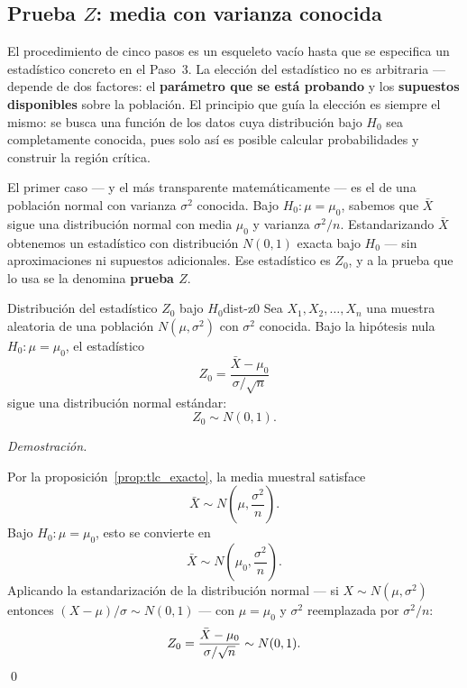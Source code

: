 \documentclass[12pt, a4paper]{book}
\renewenvironment{proof}{%
    \par\medskip\noindent\textit{Demostraci\'{o}n.}\enspace
}{\qed\par\medskip}
\numberwithin{equation}{chapter}
\begin{document}
\subsection{Prueba $Z$: media con varianza conocida}

El procedimiento de cinco pasos es un esqueleto
vac\'{i}o hasta que se especifica un estad\'{i}stico
concreto en el Paso~3. La elecci\'{o}n del
estad\'{i}stico no es arbitraria --- depende de dos
factores: el \textbf{par\'{a}metro que se est\'{a}
	probando} y los \textbf{supuestos disponibles} sobre
la poblaci\'{o}n. El principio que gu\'{i}a la
elecci\'{o}n es siempre el mismo: se busca una
funci\'{o}n de los datos cuya distribuci\'{o}n bajo
$H_0$ sea completamente conocida, pues solo as\'{i}
es posible calcular probabilidades y construir la
regi\'{o}n cr\'{i}tica.

El primer caso --- y el m\'{a}s transparente
matem\'{a}ticamente --- es el de una poblaci\'{o}n
normal con varianza $\sigma^2$ conocida. Bajo
$H_0: \mu = \mu_0$, sabemos que $\bar{X}$ sigue
una distribuci\'{o}n normal con media $\mu_0$ y
varianza $\sigma^2/n$. Estandarizando $\bar{X}$
obtenemos un estad\'{i}stico con distribuci\'{o}n
$N(0,1)$ exacta bajo $H_0$ --- sin aproximaciones
ni supuestos adicionales. Ese estad\'{i}stico es
$Z_0$, y a la prueba que lo usa se la denomina
\textbf{prueba $Z$}.

\begin{proposicion}{Distribuci\'{o}n del estad\'{i}stico
		$Z_0$ bajo $H_0$}{dist-z0}
	Sea $X_1, X_2, \ldots, X_n$ una muestra
	aleatoria de una poblaci\'{o}n
	$N(\mu, \sigma^2)$ con $\sigma^2$ conocida.
	Bajo la hip\'{o}tesis nula $H_0: \mu = \mu_0$,
	el estad\'{i}stico
	\[
	Z_0 = \frac{\bar{X} - \mu_0}{\sigma /
		\sqrt{n}}
	\]
	sigue una distribuci\'{o}n normal est\'{a}ndar:
	\[
	Z_0 \sim N(0, 1).
	\]
\end{proposicion}

\begin{proof}
	Por la proposici\'{o}n~\ref{prop:tlc_exacto},
	la media muestral satisface
	\[
	\bar{X} \sim N\!\left(\mu,
	\frac{\sigma^2}{n}\right).
	\]
	Bajo $H_0: \mu = \mu_0$, esto se convierte en
	\[
	\bar{X} \sim N\!\left(\mu_0,
	\frac{\sigma^2}{n}\right).
	\]
	Aplicando la estandarizaci\'{o}n de la
	distribuci\'{o}n normal --- si
	$X \sim N(\mu, \sigma^2)$ entonces
	$(X - \mu)/\sigma \sim N(0,1)$ --- con
	$\mu = \mu_0$ y $\sigma^2$ reemplazada por
	$\sigma^2/n$:
	\[
	Z_0 = \frac{\bar{X} - \mu_0}{\sigma /
		\sqrt{n}} \sim N(0, 1). \qedhere
	\]
\end{proof}
\end{document}
